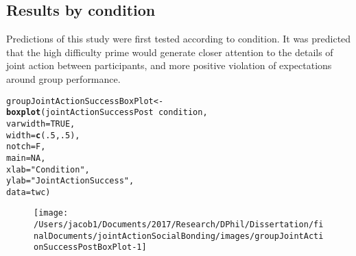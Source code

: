 \documentclass[english]{article}\usepackage[]{graphicx}\usepackage[]{color}
\makeatletter
\def\maxwidth{ %
  \ifdim\Gin@nat@width>\linewidth
    \linewidth
  \else
    \Gin@nat@width
  \fi
}
\newcommand{\hlnum}[1]{\textcolor[rgb]{0.686,0.059,0.569}{#1}}%
\newcommand{\hlstr}[1]{\textcolor[rgb]{0.192,0.494,0.8}{#1}}%
\newcommand{\hlopt}[1]{\textcolor[rgb]{0,0,0}{#1}}%
\newcommand{\hlstd}[1]{\textcolor[rgb]{0.345,0.345,0.345}{#1}}%
\newcommand{\hlkwb}[1]{\textcolor[rgb]{0.69,0.353,0.396}{#1}}%
\newcommand{\hlkwc}[1]{\textcolor[rgb]{0.333,0.667,0.333}{#1}}%
\newcommand{\hlkwd}[1]{\textcolor[rgb]{0.737,0.353,0.396}{\textbf{#1}}}%
\newenvironment{kframe}{%
 \def\at@end@of@kframe{}%
 \ifinner\ifhmode%
  \def\at@end@of@kframe{\end{minipage}}%
  \begin{minipage}{\columnwidth}%
 \fi\fi%
 \def\FrameCommand##1{\hskip\@totalleftmargin \hskip-\fboxsep
 \colorbox{shadecolor}{##1}\hskip-\fboxsep
     \hskip-\linewidth \hskip-\@totalleftmargin \hskip\columnwidth}%
 \MakeFramed {\advance\hsize-\width
   \@totalleftmargin\z@ \linewidth\hsize
   \@setminipage}}%
 {\par\unskip\endMakeFramed%
 \at@end@of@kframe}
\newenvironment{knitrout}{}{} %
\makeatother
\begin{document}
\subsection{Results by condition}
Predictions of this study were first tested according to condition. It was predicted that the high difficulty prime would generate closer attention to the details of joint action between participants, and more positive violation of expectations around group performance.



\begin{knitrout}
\color{fgcolor}\begin{kframe}
\begin{alltt}
  \hlstd{groupJointActionSuccessBoxPlot} \hlkwb{<-} \hlkwd{boxplot}\hlstd{(jointActionSuccessPost} \hlopt{~} \hlstd{condition,}
                                          \hlkwc{varwidth} \hlstd{=} \hlnum{TRUE}\hlstd{,}
                                          \hlkwc{width} \hlstd{=} \hlkwd{c}\hlstd{(}\hlnum{.5}\hlstd{,}\hlnum{.5}\hlstd{),}
                                          \hlkwc{notch} \hlstd{= F,}
                                          \hlkwc{main} \hlstd{=} \hlnum{NA}\hlstd{,}
                                          \hlkwc{xlab} \hlstd{=} \hlstr{"Condition"}\hlstd{,}
                                          \hlkwc{ylab} \hlstd{=} \hlstr{"Joint Action Success"}\hlstd{,}
                                          \hlkwc{data} \hlstd{= twc)}
\end{alltt}
\end{kframe}\begin{figure}

{\centering \texttt{[image: /Users/jacob1/Documents/2017/Research/DPhil/Dissertation/finalDocuments/jointActionSocialBonding/images/groupJointActionSuccessPostBoxPlot-1]} 

}

\end{figure}


\end{knitrout}
\end{document}
